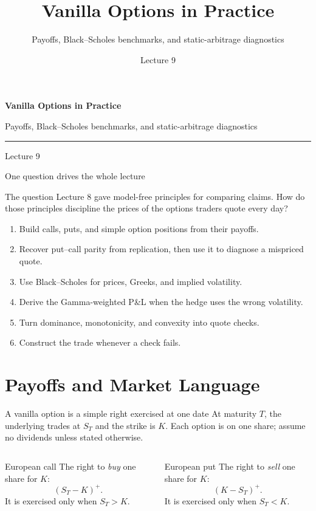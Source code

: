 \documentclass[handout,10pt,aspectratio=169]{beamer}
\title{Vanilla Options in Practice}
\subtitle{Payoffs, Black--Scholes benchmarks, and static-arbitrage diagnostics}
\author{}
\date{Lecture 9}
\newcommand{\1}{\mathbf 1}
\begin{document}
\begin{frame}[plain]
  \vfill
  {\LARGE\bfseries\color{CourseBlue}Vanilla Options in Practice\par}
  \medskip
  {\large Payoffs, Black--Scholes benchmarks, and static-arbitrage diagnostics\par}
  \medskip
  {\color{CourseGold}\rule{0.94\textwidth}{0.8pt}}
  \medskip
  {Lecture 9\par}
  \vfill
\end{frame}

\begin{frame}{One question drives the whole lecture}
\begin{block}{The question}
Lecture 8 gave model-free principles for comparing claims. How do those
principles discipline the prices of the options traders quote every day?
\end{block}
\begin{enumerate}
  \item Build calls, puts, and simple option positions from their payoffs.
  \item Recover put--call parity from replication, then use it to diagnose a
        mispriced quote.
  \item Use Black--Scholes for prices, Greeks, and implied volatility.
  \item Derive the Gamma-weighted P\&L when the hedge uses the wrong volatility.
  \item Turn dominance, monotonicity, and convexity into quote checks.
  \item Construct the trade whenever a check fails.
\end{enumerate}
\end{frame}

\section{Payoffs and Market Language}

\begin{frame}{A vanilla option is a simple right exercised at one date}
At maturity \(T\), the underlying trades at \(S_T\) and the strike is \(K\).
Each option is on one share; assume no dividends unless stated otherwise.
\begin{columns}[T,onlytextwidth]
\begin{block}{European call}
The right to \emph{buy} one share for \(K\):
\[
\boxed{(S_T-K)^+.}
\]
It is exercised only when \(S_T>K\).
\end{block}
\begin{exampleblock}{European put}
The right to \emph{sell} one share for \(K\):
\[
\boxed{(K-S_T)^+.}
\]
It is exercised only when \(S_T<K\).
\end{exampleblock}
\end{columns}

\end{frame}
\end{document}
